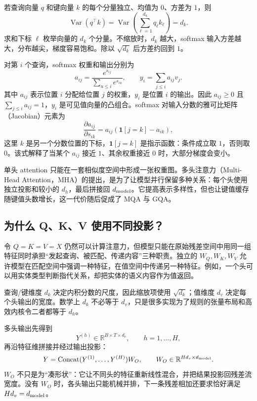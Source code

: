 \begin{mathbox}
若查询向量 $q$ 和键向量 $k$ 的每个分量独立、均值为 $0$、方差为 $1$，则
\[
\operatorname{Var}(q^\top k)=\operatorname{Var}\left(\sum_{\ell=1}^{d_k}q_\ell k_\ell\right)=d_k.
\]
求和下标 $\ell$ 枚举向量的 $d_k$ 个分量。不缩放时，$d_k$ 越大，softmax 输入方差越大，分布越尖，梯度容易饱和。除以 $\sqrt{d_k}$ 后方差约回到 $1$。
\end{mathbox}

对第 $i$ 个查询，softmax 权重和输出分别为
\[
a_{ij}=\frac{e^{s_{ij}}}{\sum_{u\le i}e^{s_{iu}}},
\qquad
y_i=\sum_{j\le i}a_{ij}v_j.
\]
其中 $a_{ij}$ 表示位置 $i$ 分配给位置 $j$ 的权重，$y_i$ 是位置 $i$ 的输出。因此 $a_{ij}\ge 0$ 且 $\sum_{j\le i}a_{ij}=1$，$y_i$ 是可见值向量的凸组合。softmax 对输入分数的雅可比矩阵（Jacobian）元素为
\[
\frac{\partial a_{ij}}{\partial s_{ik}}
=a_{ij}(\mathbf 1[j=k]-a_{ik}),
\]
这里 $k$ 是另一个分数位置的下标，$\mathbf 1[j=k]$ 是指示函数：条件成立取 $1$，否则取 $0$。该式解释了当某个 $a_{ij}$ 接近 $1$、其余权重接近 $0$ 时，大部分梯度会变小。

单头 attention 只能在一套相似度空间中形成一张权重图。多头注意力（Multi-Head Attention，MHA）的提出，是为了让模型并行保留多种关系：每个头使用独立投影和较小的 $d_h$，最后拼接回 $d_{\rm model}$。它提高表示多样性，但也让键值缓存随键值头数增长，这一代价随后促成了 MQA 与 GQA。

\subsection{为什么 Q、K、V 使用不同投影？}

令 $Q=K=V=X$ 仍然可以计算注意力，但模型只能在原始残差空间中用同一组特征同时承担“发起查询、被匹配、传递内容”三种职责。独立的 $W_Q,W_K,W_V$ 允许模型在匹配空间中强调一种特征，在值空间中传递另一种特征。例如，一个头可以用实体类型判断指代关系，却把实体的语义内容作为值返回。

查询/键维度 $d_k$ 决定内积分数的尺度，因此缩放项使用 $\sqrt{d_k}$；值维度 $d_v$ 决定每个头输出的宽度。数学上 $d_k$ 不必等于 $d_v$，只是很多实现为了规则的张量布局和高效内核令二者都等于 $d_h$。

多头输出先得到
\[
Y^{(h)}\in\mathbb R^{B\times T\times d_v},\qquad h=1,\ldots,H,
\]
再沿特征维拼接并经过输出投影：
\[
Y=\operatorname{Concat}(Y^{(1)},\ldots,Y^{(H)})W_O,\qquad
W_O\in\mathbb R^{Hd_v\times d_{\rm model}}.
\]
$W_O$ 不只是为“凑形状”：它让不同头的特征重新线性混合，并把结果投影回残差流宽度。没有 $W_O$ 时，各头输出只能机械并排，下一条残差相加还要求恰好满足 $Hd_v=d_{\rm model}$。

